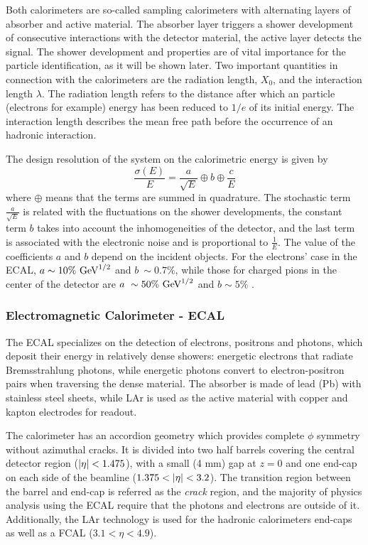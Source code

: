 Both calorimeters are so-called sampling calorimeters with alternating layers of absorber and active material. The absorber layer triggers a shower development of consecutive interactions with the detector material, the active layer detects the signal.
The shower development and properties are of vital importance for the particle identification, as it will be shown later.
Two important quantities in connection with the calorimeters are the radiation length, $X_0$, and the interaction length $\lambda$. The radiation length refers to the distance after which an particle (electrons for example) energy has been reduced to \(1/e\) of its initial energy. The interaction length describes the mean free path before the occurrence of an hadronic interaction.

The design resolution of the system on the calorimetric energy is given by
\begin{equation}
    \frac{\sigma(E)}{E} = 
    \frac{a}{\sqrt{E}} \oplus b \oplus \frac{c}{E}
\end{equation}
where \(\oplus\) means that the terms are summed in quadrature. The stochastic term \(\frac{a}{\sqrt{E}}\) is related with the fluctuations on the shower developments, the constant term \(b\) takes into account the inhomogeneities of the detector, and the last term is associated with the electronic noise and is proportional to \(\frac{1}{E}\). The value of the coefficients \(a\) and \(b\) depend on the incident objects. For the electrons' case in the \ac{ECAL}, \(a\sim 10\%~\text{GeV}^{1/2}\) and \(b~\sim 0.7\%\), while those for charged pions in the center of the detector are \(a~\sim50\%~\text{GeV}^{1/2}\) and \(b\sim5\%\) \cite{PerformanceCalorimeteresRun2}.



\subsubsection{Electromagnetic Calorimeter - ECAL}
\label{subsubsec:atlas:atlas:cals:ecal}

The \ac{ECAL} specializes on the detection of electrons, positrons and photons, which deposit their energy in relatively dense showers: energetic electrons that radiate Bremsstrahlung photons, while energetic photons convert to electron-positron pairs when traversing the dense material.
The absorber is made of lead (Pb) with stainless steel sheets, while \ac{LAr} is used as the active material with copper and kapton electrodes for readout.


The calorimeter has an accordion geometry which provides complete \(\phi\) symmetry without azimuthal cracks. 
It is divided into two half barrels covering the central detector region (\(|\eta|<1.475\)), with a small (4 mm) gap at $z = 0$ and one end-cap on each side of the beamline (\(1.375<\abseta<3.2\)).
The transition region between the barrel and end-cap is referred as the \textit{crack} region, and the majority of physics analysis using the \ac{ECAL} require that the photons and electrons are outside of it.
Additionally, the \ac{LAr} technology is used for the hadronic calorimeters end-caps as well as a \ac{FCAL} ($3.1 < \eta < 4.9$).

